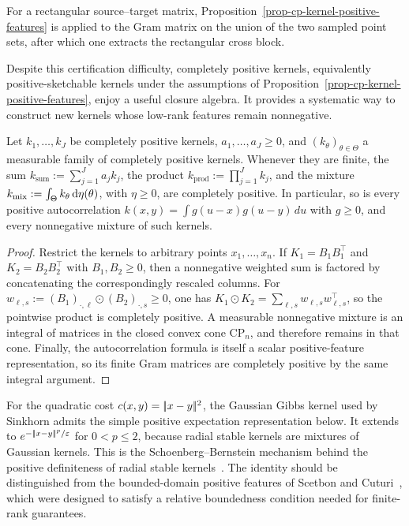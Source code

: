 
For a rectangular source--target matrix, Proposition~\ref{prop-cp-kernel-positive-features} is applied to the Gram matrix on the union of the two sampled point sets, after which one extracts the rectangular cross block.

Despite this certification difficulty, completely positive kernels, equivalently positive-sketchable kernels under the assumptions of Proposition~\ref{prop-cp-kernel-positive-features}, enjoy a useful closure algebra. It provides a systematic way to construct new kernels whose low-rank features remain nonnegative.
\begin{prop}
\label{prop-completely-positive-kernel-closure}
Let \(k_1,\ldots,k_J\) be completely positive kernels, \(a_1,\ldots,a_J\geq0\), and \((k_\theta)_{\theta\in\Theta}\) a measurable family of completely positive kernels. Whenever they are finite, the sum \(k_{\mathrm{sum}}:=\sum_{j=1}^J a_jk_j\), the product \(k_{\mathrm{prod}}:=\prod_{j=1}^J k_j\), and the mixture \(k_{\mathrm{mix}}:=\int_\Theta k_\theta\,\mathrm{d}\eta(\theta)\), with \(\eta\geq0\), are completely positive. In particular, so is every positive autocorrelation
$k(x,y)=\int g(u-x)g(u-y)\,du$ with $g\geq0$,
and every nonnegative mixture of such kernels.
\end{prop}

\begin{proof}
Restrict the kernels to arbitrary points \(x_1,\ldots,x_n\). If \(K_1=B_1B_1^\top\) and \(K_2=B_2B_2^\top\) with \(B_1,B_2\geq0\), then a nonnegative weighted sum is factored by concatenating the correspondingly rescaled columns. For \(w_{\ell,s}:=(B_1)_{\cdot,\ell}\odot(B_2)_{\cdot,s}\geq0\), one has \(K_1\odot K_2=\sum_{\ell,s}w_{\ell,s}w_{\ell,s}^\top\), so the pointwise product is completely positive. A measurable nonnegative mixture is an integral of matrices in the closed convex cone \(\mathrm{CP}_n\), and therefore remains in that cone. Finally, the autocorrelation formula is itself a scalar positive-feature representation, so its finite Gram matrices are completely positive by the same integral argument.
\end{proof}

For the quadratic cost \(c(x,y)=|\!| x-y |\!|^2\), the Gaussian Gibbs kernel used by Sinkhorn admits the simple positive expectation representation below. It extends to \(e^{-|\!| x-y |\!|^p/\varepsilon}\) for \(0<p\leq2\), because radial stable kernels are mixtures of Gaussian kernels. This is the Schoenberg--Bernstein mechanism behind the positive definiteness of radial stable kernels~\cite{schoenberg38,berg84harmonic}. The identity should be distinguished from the bounded-domain positive features of Scetbon and Cuturi~\cite{ScetbonCuturi2020PositiveFeatures}, which were designed to satisfy a relative boundedness condition needed for finite-rank guarantees.

